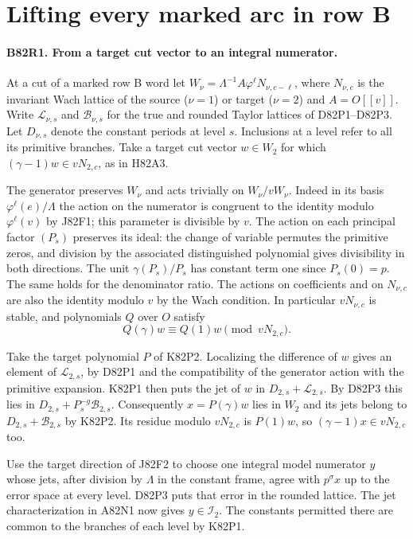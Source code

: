 \section{Lifting every marked arc in row B}

\paragraph{B82R1. From a target cut vector to an integral numerator.}
At a cut of a marked row B word let $W_\nu=\Lambda^{-1}
A\varphi^\ell N_{\nu,c-\ell}$, where $N_{\nu,c}$ is the
invariant Wach lattice of the source ($\nu=1$) or target
($\nu=2$) and $A=O[[v]]$. Write $\mathcal L_{\nu,s}$ and
$\mathcal B_{\nu,s}$ for the true and rounded Taylor lattices
of D82P1--D82P3. Let $D_{\nu,s}$ denote the constant periods
at level $s$. Inclusions at a level refer to all its primitive
branches. Take a target cut vector $w\in W_2$ for which
$(\gamma-1)w\in vN_{2,c}$, as in H82A3.

The generator preserves $W_\nu$ and acts trivially on
$W_\nu/vW_\nu$. Indeed in its basis
$\varphi^\ell(e)/\Lambda$ the action on the numerator is
congruent to the identity modulo $\varphi^\ell(v)$ by J82F1;
this parameter is divisible by $v$. The action on each
principal factor $(P_s)$ preserves its ideal: the change of
variable permutes the primitive zeros, and division by the
associated distinguished polynomial gives divisibility in both
directions. The unit $\gamma(P_s)/P_s$ has constant term one
since $P_s(0)=p$. The same holds for the denominator ratio.
The actions on coefficients and on $N_{\nu,c}$ are also the
identity modulo $v$ by the Wach condition. In particular
$vN_{\nu,c}$ is stable, and polynomials $Q$ over $O$ satisfy
\[
           Q(\gamma)w\equiv Q(1)w\pmod{vN_{2,c}} .
\]

Take the target polynomial $P$ of K82P2. Localizing the
difference of $w$ gives an element of $\mathcal L_{2,s}$,
by D82P1 and the compatibility of the generator action with
the primitive expansion. K82P1 then puts the jet of $w$ in
$D_{2,s}+\mathcal L_{2,s}$. By D82P3 this lies in
$D_{2,s}+P_s^{-g}\mathcal B_{2,s}$. Consequently $x=P(\gamma)w$
lies in $W_2$ and its jets belong to
$D_{2,s}+\mathcal B_{2,s}$ by K82P2. Its residue modulo
$vN_{2,c}$ is $P(1)w$, so $(\gamma-1)x\in vN_{2,c}$ too.

Use the target direction of J82F2 to choose one integral model
numerator $y$ whose jets, after division by $\Lambda$ in the
constant frame, agree with $p^\sigma x$ up to the error space
at every level. D82P3 puts that error in the rounded lattice.
The jet characterization in A82N1 now gives
$y\in\mathcal I_2$. The constants permitted there are common
to the branches of each level by K82P1.

